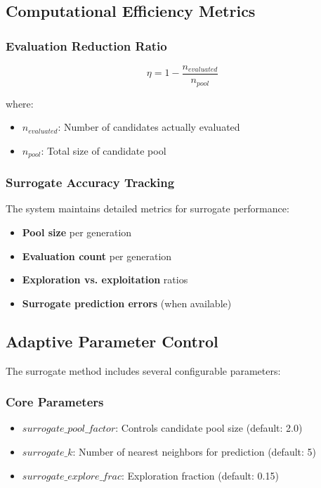 \documentclass[12pt,a4paper]{article}
\begin{document}
\subsection{Computational Efficiency Metrics}

\subsubsection{Evaluation Reduction Ratio}
\begin{equation}
\eta = 1 - \frac{n_{evaluated}}{n_{pool}}
\end{equation}

where:
\begin{itemize}
\item $n_{evaluated}$: Number of candidates actually evaluated
\item $n_{pool}$: Total size of candidate pool
\end{itemize}

\subsubsection{Surrogate Accuracy Tracking}
The system maintains detailed metrics for surrogate performance:
\begin{itemize}
\item \textbf{Pool size} per generation
\item \textbf{Evaluation count} per generation
\item \textbf{Exploration vs. exploitation} ratios
\item \textbf{Surrogate prediction errors} (when available)
\end{itemize}

\subsection{Adaptive Parameter Control}

The surrogate method includes several configurable parameters:

\subsubsection{Core Parameters}
\begin{itemize}
\item \textbf{$surrogate\_pool\_factor$}: Controls candidate pool size (default: 2.0)
\item \textbf{$surrogate\_k$}: Number of nearest neighbors for prediction (default: 5)
\item \textbf{$surrogate\_explore\_frac$}: Exploration fraction (default: 0.15)
\end{itemize}
\end{document}
